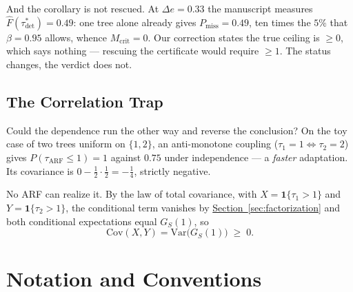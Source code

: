 \documentclass[10pt,conference]{IEEEtran}
\theoremstyle{definition}
\begin{document}
And the corollary is not rescued. At $\Delta e = 0.33$ the manuscript measures
$\widehat F(\tau^*_{\mathrm{det}}) = 0.49$: one tree alone already gives
$P_{\mathrm{miss}} = 0.49$, ten times the $5\%$ that $\beta = 0.95$ allows, whence
$M_{\mathrm{crit}} = 0$. Our correction states the true ceiling is $\ge 0$, which says
nothing --- rescuing the certificate would require $\ge 1$. The status changes, the verdict
does not.

\subsection{The Correlation Trap}

Could the dependence run the other way and reverse the conclusion? On the toy case of
two trees uniform on $\{1,2\}$, an anti-monotone coupling ($\tau_1 = 1 \iff \tau_2 = 2$)
gives $P(\tau_{\mathrm{ARF}} \le 1) = 1$ against $0.75$ under independence --- a
\emph{faster} adaptation. Its covariance is
$0 - \tfrac12\cdot\tfrac12 = -\tfrac14$, strictly negative.

No ARF can realize it. By the law of total covariance, with
$X=\mathbf{1}\{\tau_1{>}1\}$ and $Y=\mathbf{1}\{\tau_2{>}1\}$, the conditional term
vanishes by \hyperref[sec:factorization]{Section~\ref*{sec:factorization}} and both conditional expectations equal
$G_S(1)$, so
\[
  \mathrm{Cov}(X,Y) = \mathrm{Var}\big(G_S(1)\big) \;\ge\; 0 .
\]

\begin{center}
\end{center}

\section{Notation and Conventions}
\label{app:notation}
\end{document}
